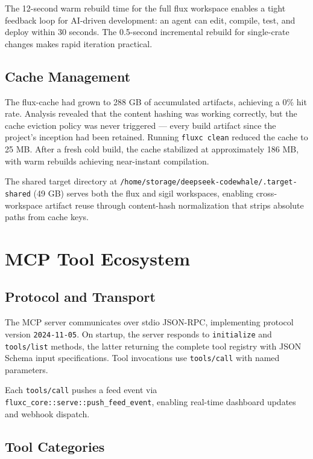 \documentclass[11pt,a4paper]{article}
\begin{document}
The 12-second warm rebuild time for the full flux workspace enables a tight feedback loop for AI-driven development: an agent can edit, compile, test, and deploy within 30 seconds. The 0.5-second incremental rebuild for single-crate changes makes rapid iteration practical.

\subsection{Cache Management}

The flux-cache had grown to 288 GB of accumulated artifacts, achieving a 0\% hit rate. Analysis revealed that the content hashing was working correctly, but the cache eviction policy was never triggered — every build artifact since the project's inception had been retained. Running \texttt{fluxc clean} reduced the cache to 25 MB. After a fresh cold build, the cache stabilized at approximately 186 MB, with warm rebuilds achieving near-instant compilation.

The shared target directory at \texttt{/home/storage/deepseek-codewhale/.target-shared} (49 GB) serves both the flux and sigil workspaces, enabling cross-workspace artifact reuse through content-hash normalization that strips absolute paths from cache keys.

\section{MCP Tool Ecosystem}

\subsection{Protocol and Transport}

The MCP server communicates over stdio JSON-RPC, implementing protocol version \texttt{2024-11-05}. On startup, the server responds to \texttt{initialize} and \texttt{tools/list} methods, the latter returning the complete tool registry with JSON Schema input specifications. Tool invocations use \texttt{tools/call} with named parameters.

Each \texttt{tools/call} pushes a feed event via \texttt{fluxc\_core::serve::push\_feed\_event}, enabling real-time dashboard updates and webhook dispatch.

\subsection{Tool Categories}
\end{document}
